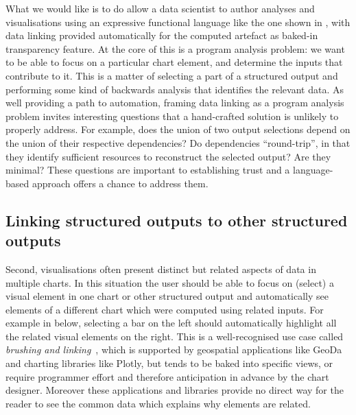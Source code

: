What we would like is to do allow a data scientist to author analyses and visualisations using an expressive functional language like the one shown in , with data linking provided automatically for the computed artefact as baked-in transparency feature. At the core of this is a program analysis problem: we want to be able to focus on a particular chart element, and determine the inputs that contribute to it. This is a matter of selecting a part of a structured output and performing some kind of backwards analysis that identifies the relevant data. As well providing a path to automation, framing data linking as a program analysis problem invites interesting questions that a hand-crafted solution is unlikely to properly address. For example, does the union of two output selections depend on the union of their respective dependencies? Do dependencies ``round-trip'', in that they identify sufficient resources to reconstruct the selected output? Are they minimal? These questions are important to establishing trust and a language-based approach offers a chance to address them.

\subsection{Linking structured outputs to other structured outputs}
\label{sec:introduction:vis-linking}

Second, visualisations often present distinct but related aspects of data in multiple charts. In this situation the user should be able to focus on (select) a visual element in one chart or other structured output and automatically see elements of a different chart which were computed using related inputs. For example in  below, selecting a bar on the left should automatically highlight all the related visual elements on the right. This is a well-recognised use case called \emph{brushing and linking}~\cite{becker87}, which is supported by geospatial applications like GeoDa~\cite{anselin06} and charting libraries like Plotly, but tends to be baked into specific views, or require programmer effort and therefore anticipation in advance by the chart designer. Moreover these applications and libraries provide no direct way for the reader to see the common data which explains why elements are related.

